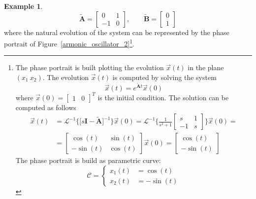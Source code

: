\documentclass[11pt,a4paper,oneside]{book}
\numberwithin{equation}{section}
\theoremstyle{it}
\theoremstyle{definition}
\newtheorem{example}{Example}[chapter]
\begin{document}
\begin{example}
	\begin{equation}\label{spring_mass_eq_5}
		\tilde{\mathbf{A}} = \begin{bmatrix}
			0&1 \\[6pt] -1 &  0
		\end{bmatrix}, \qquad
		\tilde{\mathbf{B}} = \begin{bmatrix}
			0 \\[6pt] 1
		\end{bmatrix}
	\end{equation}
	where the natural evolution of the system can be represented by the phase 
	portrait of Figure~\ref{armonic_oscillator_2}\footnote{The phase portrait is built plotting the evolution $\vec{x}(t)$ in the plane $(x_1\ x_2)$. The evolution $\vec{x}(t)$ is computed by solving the system
		\begin{equation}
			\vec{x}(t) = e^{\tilde{\mathbf{A}}t}\vec{x}(0)
		\end{equation}
		where $\vec{x}(0)=\begin{bmatrix}
			1&0
		\end{bmatrix}^T$ is the initial condition. The solution can be computed as follows
		\begin{equation}
			\begin{aligned}
				\vec{x}(t) &= 
				\mathcal{L}^{-1}\Big\{\Big[s\mathbf{I}-\tilde{\mathbf{A}}\Big]^{-1}\Big\}\vec{x}(0)
				= \mathcal{L}^{-1}\Bigg\{\frac{1}{s^2+1}\begin{bmatrix} s & 1 \\[6pt] -1 & s 
				\end{bmatrix}\Bigg\}\vec{x}(0) = \\[6pt]
				&= \begin{bmatrix} \cos(t) & \sin(t) \\[6pt] -\sin(t) & \cos(t) \end{bmatrix}\vec{x}(0) = \begin{bmatrix} \cos(t) \\[6pt] -\sin(t) \end{bmatrix}
			\end{aligned}
		\end{equation}
		The phase portrait is build as parametric curve:
		\begin{equation}
			\mathcal{C}=\left\lbrace \begin{aligned}
				x_1(t)&=\cos(t) \\[6pt]
				x_2(t)&=-\sin(t) 
			\end{aligned}\right. 
		\end{equation}
	}. 
	

\end{example}
\end{document}
